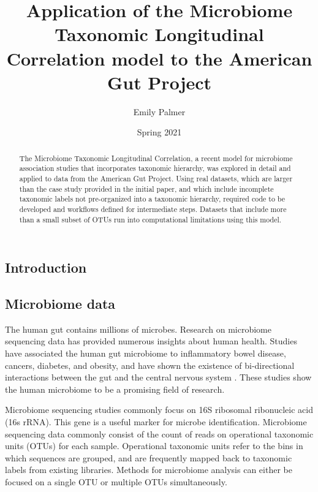 \documentclass[12pt]{article}
\title{Application of the Microbiome Taxonomic Longitudinal Correlation model to the American Gut Project}
\author{Emily Palmer}
\date{Spring 2021}
\begin{document}
\begin{singlespace}
\maketitle
\end{singlespace}
\begin{abstract}
  The Microbiome Taxonomic Longitudinal Correlation, a recent model for microbiome association studies that incorporates taxonomic hierarchy, was explored in detail and applied to data from the American Gut Project.
  Using real datasets, which are larger than the case study provided in the initial paper, and which include incomplete taxonomic labels not pre-organized into a taxonomic hierarchy, required code to be developed and workflows defined for intermediate steps. Datasets that include more than a small subset of OTUs run into computational limitations using this model.
\end{abstract}


\begin{singlespace}
\section{Introduction}
\end{singlespace}

\subsection{Microbiome data}
The human gut contains millions of microbes. Research on microbiome sequencing data has provided numerous insights about human health. Studies have associated the human gut microbiome to inflammatory bowel disease, cancers, diabetes, and obesity, and have shown the existence of bi-directional interactions between the gut and the central nervous system \cite{kinross2008human, mayer2015gut}. These studies show the human microbiome to be a promising field of research.


Microbiome sequencing studies commonly focus on 16S ribosomal ribonucleic acid (16s rRNA). This gene is a useful marker for microbe identification. Microbiome sequencing data commonly consist of the count of reads on operational taxonomic units (OTUs) for each sample. Operational taxonomic units refer to the bins in which sequences are grouped, and are frequently mapped back to taxonomic labels from existing libraries. Methods for microbiome analysis can either be focused on a single OTU or multiple OTUs simultaneously.
\end{document}
